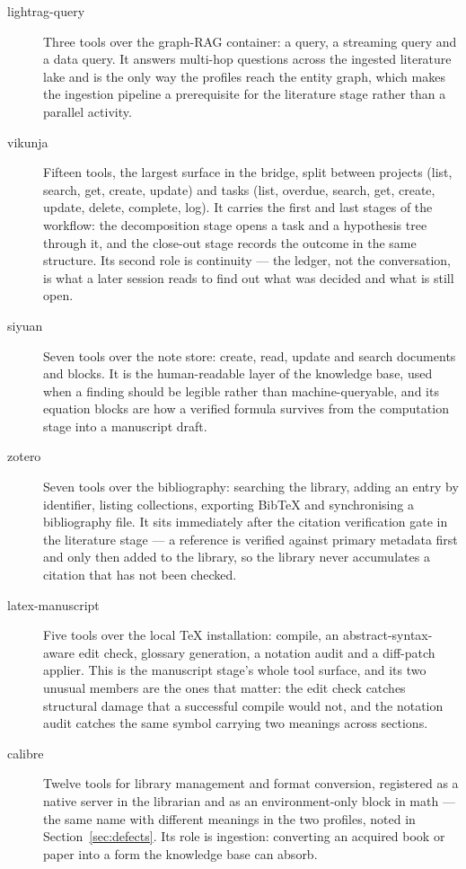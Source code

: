\documentclass[10pt]{article}
\newcommand{\mono}[1]{{\ttfamily\small #1}}
\begin{document}
\begin{description}
\item[\mono{lightrag-query}] Three tools over the graph-RAG container: a query, a streaming query
and a data query. It answers multi-hop questions across the ingested literature lake and is the only
way the profiles reach the entity graph, which makes the ingestion pipeline a prerequisite for the
literature stage rather than a parallel activity.

\item[\mono{vikunja}] Fifteen tools, the largest surface in the bridge, split between projects
(list, search, get, create, update) and tasks (list, overdue, search, get, create, update, delete,
complete, log). It carries the first and last stages of the workflow: the decomposition stage opens a
task and a hypothesis tree through it, and the close-out stage records the outcome in the same
structure. Its second role is continuity --- the ledger, not the conversation, is what a later
session reads to find out what was decided and what is still open.

\item[\mono{siyuan}] Seven tools over the note store: create, read, update and search documents and
blocks. It is the human-readable layer of the knowledge base, used when a finding should be legible
rather than machine-queryable, and its equation blocks are how a verified formula survives from the
computation stage into a manuscript draft.

\item[\mono{zotero}] Seven tools over the bibliography: searching the library, adding an entry by
identifier, listing collections, exporting BibTeX and synchronising a bibliography file. It sits
immediately after the citation verification gate in the literature stage --- a reference is verified
against primary metadata first and only then added to the library, so the library never accumulates a
citation that has not been checked.

\item[\mono{latex-manuscript}] Five tools over the local TeX installation: compile, an
abstract-syntax-aware edit check, glossary generation, a notation audit and a diff-patch applier.
This is the manuscript stage's whole tool surface, and its two unusual members are the ones that
matter: the edit check catches structural damage that a successful compile would not, and the
notation audit catches the same symbol carrying two meanings across sections.

\item[\mono{calibre}] Twelve tools for library management and format conversion, registered as a
native server in the librarian and as an environment-only block in math --- the same name with
different meanings in the two profiles, noted in Section~\ref{sec:defects}. Its role is ingestion:
converting an acquired book or paper into a form the knowledge base can absorb.

\end{description}
\end{document}

